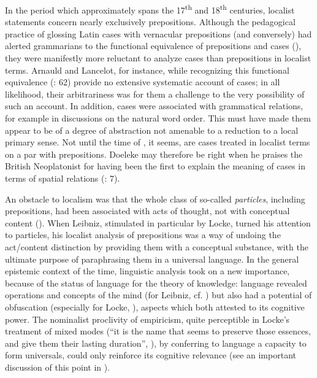 \documentclass[output=paper]{langscibook}
\begin{document}
In the period which approximately spans the 17\textsuperscript{th} and 18\textsuperscript{th} centuries, localist statements concern nearly exclusively prepositions. Although the pedagogical practice of glossing Latin cases with vernacular prepositions (and conversely) had alerted grammarians to the functional equivalence of prepositions and cases (\citealt[26]{colombat_histoire_2010}), they were manifestly more reluctant to analyze cases than prepositions in localist terms. Arnauld and Lancelot, for instance, while recognizing this functional equivalence (\citealt{arnauld_grammaire_1969}: 62) provide no extensive systematic account of cases; in all likelihood, their arbitrariness was for them a challenge to the very possibility of such an account. In addition, cases were associated with grammatical relations, for example in discussions on the natural word order. This must have made them appear to be of a degree of abstraction not amenable to a reduction to a local primary sense. Not until the time of \citet{harris_hermes_1773}, it seems, are cases treated in localist terms on a par with prepositions. Doeleke may therefore be right when he praises the British Neoplatonist for having been the first to explain the meaning of cases in terms of spatial relations (\citeyear{doeleke_versuche_1814}: 7).

An obstacle to localism was that the whole class of so-called \textit{particles}, including prepositions, had been associated with acts of thought, not with conceptual content (\citealt{nuchelmans_historical_1986}). When Leibniz, stimulated in particular by Locke, turned his attention to particles, his localist analysis of prepositions was a way of undoing the act\slash content distinction by providing them with a conceptual substance, with the ultimate purpose of paraphrasing them in a universal language. In the general epistemic context of the time, linguistic analysis took on a new importance, because of the status of language for the theory of knowledge: language revealed operations and concepts of the mind (for Leibniz, cf. \citealt{dascal_leibniz_1990}) but also had a potential of obfuscation (especially for Locke, \citealt{dawson_locke_2007}), aspects which both attested to its cognitive power. The nominalist proclivity of empiricism, quite perceptible in Locke’s treatment of mixed modes (“it is the name that seems to preserve those essences, and give them their lasting duration”, \citealt[434]{LockeHumanUnderstanding}), by conferring to language a capacity to form universals, could only reinforce its cognitive relevance (see an important discussion of this point in \citealt{formigari_language_1988}).
\end{document}
